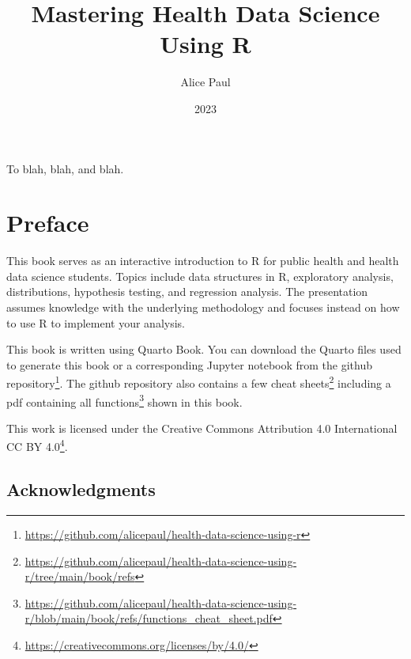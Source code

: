 \documentclass[
  letterpaper,
]{krantz}
\title{Mastering Health Data Science Using R}
\author{Alice Paul}
\date{2023}
\renewcommand{\href}[2]{#2\footnote{\url{#1}}}
\renewcommand*\contentsname{Table of contents}
\newcommand\contentsname{Table of contents}
\begin{document}
\maketitle


\thispagestyle{empty}

\begin{center}
To blah, blah, and blah.
\end{center}

\setlength{\abovedisplayskip}{-5pt}
\setlength{\abovedisplayshortskip}{-5pt}

\renewcommand*\contentsname{Table of contents}
{
\hypersetup{linkcolor=}
\setcounter{tocdepth}{2}
\tableofcontents
}

\chapter*{Preface}\label{preface}


This book serves as an interactive introduction to R for public health
and health data science students. Topics include data structures in R,
exploratory analysis, distributions, hypothesis testing, and regression
analysis. The presentation assumes knowledge with the underlying
methodology and focuses instead on how to use R to implement your
analysis.

This book is written using Quarto Book. You can download the Quarto
files used to generate this book or a corresponding Jupyter notebook
from the
\href{https://github.com/alicepaul/health-data-science-using-r}{github
repository}. The github repository also contains a few
\href{https://github.com/alicepaul/health-data-science-using-r/tree/main/book/refs}{cheat
sheets} including a pdf containing
\href{https://github.com/alicepaul/health-data-science-using-r/blob/main/book/refs/functions_cheat_sheet.pdf}{all
functions} shown in this book.

This work is licensed under the Creative Commons Attribution 4.0
International \href{https://creativecommons.org/licenses/by/4.0/}{CC BY
4.0}.

\section*{Acknowledgments}\label{acknowledgments}
\end{document}

